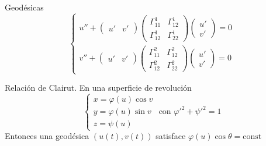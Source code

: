 \documentclass{myclass}
\begin{document}
Geodésicas
\[
  \begin{cases}
   u'' + \begin{pmatrix} u' & v' \end{pmatrix} \begin{pmatrix} \Gamma_{11}^1 & \Gamma _{12}^1 \\ \Gamma _{12}^1 & \Gamma_{22}^1 \end{pmatrix} \begin{pmatrix} u' \\ v' \end{pmatrix} =0  \\
  v'' + \begin{pmatrix} u' & v' \end{pmatrix} \begin{pmatrix} \Gamma _{11}^2 & \Gamma _{12}^2 \\ \Gamma _{12}^2 & \Gamma _{22}^2 \end{pmatrix} \begin{pmatrix} u' \\ v' \end{pmatrix} = 0
  \end{cases}
\]

Relación de Clairut. En una superficie de revolución
\[
\begin{cases}
  x = \varphi (u)\cos v\\
  y = \varphi (u)\sin v \\
  z = \psi (u)
\end{cases}
\text{ con } \varphi '^2 + \psi '^2 = 1
\] 
Entonces una geodésica $(u(t), v(t))$ satisface $\varphi (u)\cos \theta = \text{const}$
\end{document}
